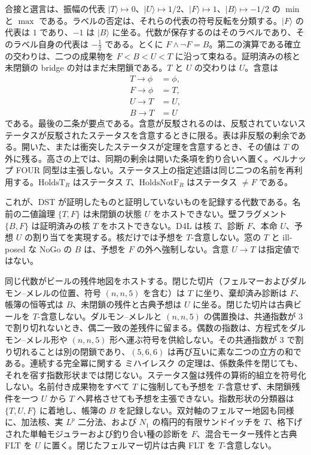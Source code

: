 \documentclass[a4paper]{article}
\theoremstyle{definition}
\begin{document}
合接と選言は、振幅の代表 \(\lvert T\rangle\mapsto 0\)、\(\lvert U\rangle\mapsto 1/2\)、\(\lvert F\rangle\mapsto 1\)、\(\lvert B\rangle\mapsto -1/2\) の \(\min\) と \(\max\) である。ラベルの否定は、それらの代表の符号反転を分類する。\(\lvert F\rangle\) の代表は \(1\) であり、\(-1\) は \(\lvert B\rangle\) に坐る。代数が保存するのはそのラベルであり、そのラベル自身の代表は \(-\tfrac12\) である。とくに \(F\wedge\neg F=B\)。第二の演算である確立の交わりは、二つの成果物を \(F<B<U<T\) に沿って束ねる。証明済みの核と未閉鎖の bridge の対はまだ未閉鎖である。\(T\) と \(U\) の交わりは \(U\)。含意は
\[
\begin{aligned}
T\to\phi&=\phi,\\
F\to\phi&=T,\\
U\to T&=U,\\
B\to T&=U
\end{aligned}
\]
である。最後の二条が要点である。含意が反駁されるのは、反駁されていないステータスが反駁されたステータスを含意するときに限る。表は非反駁の剰余である。開いた、または衝突したステータスが定理を含意するとき、その値は \(T\) の外に残る。高さの上では、同期の剰余は開いた条項を釣り合いへ置く。ベルナップ FOUR 同型は主張しない。ステータス上の指定述語は同じ二つの名前を再利用する。\(\mathrm{HoldsT}_R\) はステータス \(T\)、\(\mathrm{HoldsNotF}_R\) はステータス \(\ne F\) である。

これが、DST が証明したものと証明していないものを記録する代数である。名前の二値論理 \(\{T,F\}\) は未閉鎖の状態 \(U\) をホストできない。壁フラグメント \(\{B,F\}\) は証明済みの核 \(T\) をホストできない。D4L は核 \(T\)、診断 \(F\)、本命 \(U\)、予想 \(U\) の割り当てを実現する。核だけでは予想を \(T\)-含意しない。窓の \(T\) と ill-posed な NoGo の \(B\) は、予想を \(F\) の外へ強制しない。含意 \(U\to T\) は指定値ではない。

同じ代数がビールの残件地図をホストする。閉じた切片（フェルマーおよびダルモン--メレルの位置、符号 \((n,n,5)\) を含む）は \(T\) に坐り、棄却済み診断は \(F\)、帳簿の恒等式は \(B\)、未閉鎖の残件と古典予想は \(U\) に坐る。閉じた切片は古典ビールを \(T\)-含意しない。ダルモン--メレルと \((n,n,5)\) の偶置換は、共通指数が 3 で割り切れないとき、偶二一致の差残件に留まる。偶数の指数は、方程式をダルモン--メレル形や \((n,n,5)\) 形へ運ぶ符号を供給しない。その共通指数が 3 で割り切れることは別の閉鎖であり、\((5,6,6)\) は再び互いに素な二つの立方の和である。連続する完全冪に関する ミハイレスク の定理は、係数条件を閉じても、それを宿す指数形状までは閉じない。ステータス盤は残件の算術的組立を符号化しない。名前付き成果物をすべて \(T\) に強制しても予想を \(T\)-含意せず、未閉鎖残件を一つ \(U\) から \(T\) へ昇格させても予想を主張できない。指数形状の分類器は \(\{T,U,F\}\) に着地し、帳簿の \(B\) を記録しない。双対軸のフェルマー地図も同様に、加法核、実 \(L^p\) 二分法、および \(N_1\) の楕円的有限サンドイッチを \(T\)、格下げされた単軸モジュラーおよび釣り合い種の診断を \(F\)、混合モーター残件と古典 FLT を \(U\) に置く。閉じたフェルマー切片は古典 FLT を \(T\)-含意しない。
\end{document}
